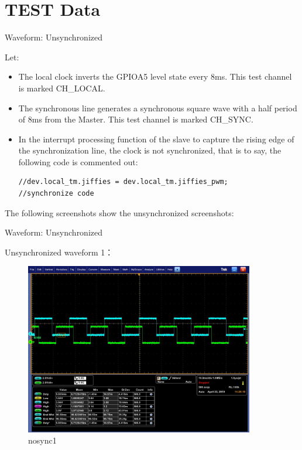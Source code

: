 \section{TEST Data}




\begin{frame}[fragile]{Waveform: Unsynchronized}

Let:
\begin{itemize}
  \item The local clock inverts the GPIOA5 level state every 8ms. This test channel is marked CH\_LOCAL.

  \item The synchronous line generates a synchronous square wave with a half period of 8ms from the Master. This test channel is marked CH\_SYNC.

  \item In the interrupt processing function of the slave to capture the rising edge of the synchronization line, the clock is not synchronized, that is to say, the following code is commented out:

  \begin{lstlisting}
//dev.local_tm.jiffies = dev.local_tm.jiffies_pwm;		//synchronize code
  \end{lstlisting}

\end{itemize}

The following screenshots show the unsynchronized screenshots:


\end{frame}


\begin{frame}[fragile]{Waveform: Unsynchronized}

Unsynchronized waveform 1\label{nosyncwave1}：

  \begin{figure}[htbp]
  \begin{center}
  \includegraphics[width=10cm]{img/nosync1}
  \caption{nosync1}
  \label{report}
  \end{center}
  \vspace{-0.5em}
  \end{figure}


\end{frame}



